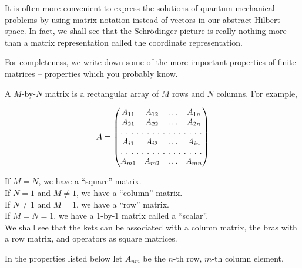 It is often more convenient to express the solutions of quantum mechanical problems by using matrix notation instead of vectors in our abstract Hilbert space. In fact, we shall see that the Schr\"odinger picture is really nothing more
than a matrix representation called the coordinate representation.

For completeness, we write down some of the more important properties of finite matrices -- properties which you probably know.

A $M$-by-$N$ matrix is a rectangular array of $M$ rows and $N$ columns. For example, 

\begin{equation}A = 
\begin{pmatrix}
A_{11} & A_{12}  & \hdots & A_{1n}  \\
A_{21} & A_{22}  & \hdots & A_{2n}  \\
\hdotsfor[2]{4}\\
A_{i1} & A_{i2}  & \hdots & A_{in}  \\
\hdotsfor[2]{4}\\
A_{m1} & A_{m2}  & \hdots & A_{mn}  \\
\end{pmatrix}
\end{equation}

If $M = N$, we have a ``square'' matrix.\\
If $N=1$ and $M\ne1$, we have a ``column'' matrix.\\
If $N\ne1$ and $M=1$, we have a ``row'' matrix.\\
If $M=N=1$, we have a 1-by-1 matrix called a ``scalar''.\\
We shall see that the kets can be associated with a column matrix, the bras with a row matrix, and operators as square matrices. 

In the properties listed below let $A_{nm}$ be the $n$-th row, $m$-th column element. 

